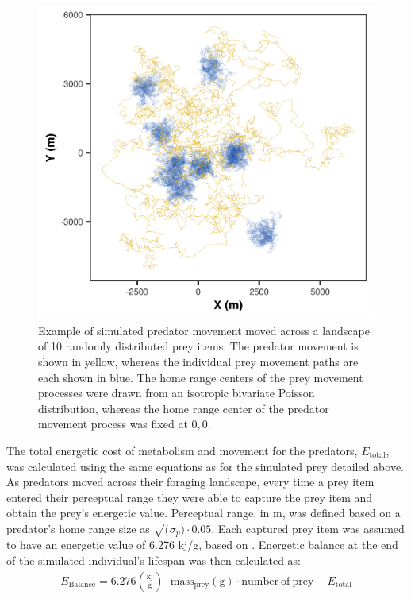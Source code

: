\documentclass[12pt]{article}
\begin{document}
\begin{figure}[!h]
\centering
\includegraphics[scale=1]{Sim_Example.png}
\caption{Example of simulated predator movement moved across a landscape of 10 randomly distributed prey items. The predator movement is shown in yellow, whereas the individual prey movement paths are each shown in blue. The home range centers of the prey movement processes were drawn from an isotropic bivariate Poisson distribution, whereas the home range center of the predator movement process was fixed at $0,0$.}
\label{fig:Pred_Example}
\end{figure}

The total energetic cost of metabolism and movement for the predators, $E_{\mathrm{total}}$, was calculated using the same equations as for the simulated prey detailed above. As predators moved across their foraging landscape, every time a prey item entered their perceptual range they were able to capture the prey item and obtain the prey's energetic value. Perceptual range, in m, was defined based on a predator's home range size as $\sqrt(\sigma_p)\cdot 0.05$. Each captured prey item was assumed to have an energetic value of 6.276 kj/g, based on \cite{Gorecki:1965}. Energetic balance at the end of the simulated individual's lifespan was then calculated as:
\begin{gather}
E_{\mathrm{Balance}} = 6.276 \mathrm{(\frac{kj}{g})} \cdot \mathrm{mass_{prey} (g) \cdot number~of~prey}  - E_{\mathrm{total}}
\end{gather}
\end{document}
